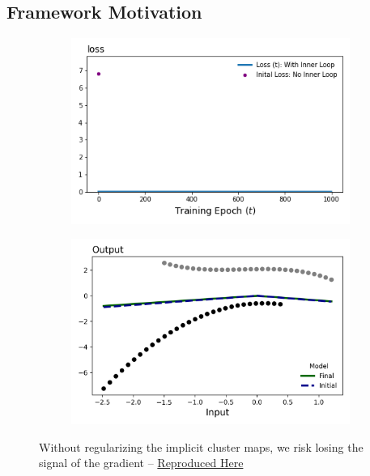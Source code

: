 \documentclass[a4paper,12pt]{article}
\begin{document}
\subsection{Framework Motivation}
\begin{figure}[htbp]
\centering
\begin{subfigure}{.48\textwidth}
    \centering
    \includegraphics[width=.95\linewidth]{figures/framework/full_inner_loop.png}
    \caption{}
\end{subfigure}
\begin{subfigure}{.48\textwidth}
    \centering
    \includegraphics[width=.95\linewidth]{figures/framework/full_inner_loop_models.png}
    \caption{}
\end{subfigure}
\caption{Without regularizing the implicit cluster maps, we risk losing the signal of the gradient -- \href{https://github.com/pharringtonp19/rfp/blob/main/notebooks/Missing_Gradients.ipynb}{Reproduced Here}}
\label{fig:Missinggrads}
\end{figure}
\end{document}
